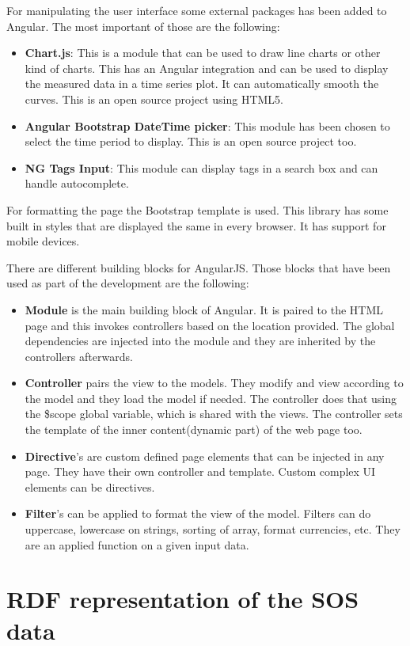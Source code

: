 For manipulating the user interface some external packages has been added to Angular. The most important of those are the following:
\begin{itemize}
\item \textbf{Chart.js}: This is a module that can be used to draw line charts or other kind of charts. This has an Angular integration and can be used to display the measured data in a time series plot. It can automatically smooth the curves. This is an open source project using HTML5.
\item \textbf{Angular Bootstrap DateTime picker}: This module has been chosen to select the time period to display. This is an open source project too.
\item \textbf{NG Tags Input}: This module can display tags in a search box and can handle autocomplete. 
\end{itemize}

For formatting the page the Bootstrap template is used. 
This library has some built in styles that are displayed the same in every browser. It has support for mobile devices.

There are different building blocks for AngularJS. Those blocks that have been used as part of the development are the following:
\begin{itemize}
\item \textbf{Module} is the main building block of Angular. It is paired to the HTML page and this invokes controllers based on the location provided. The global dependencies are injected into the module and they are inherited by the controllers afterwards.
\item \textbf{Controller} pairs the view to the models. They modify and view according to the model and they load the model if needed. The controller does that using the \$scope global variable, which is shared with the views. The controller sets the template of the inner content(dynamic part) of the web page too.
\item \textbf{Directive}'s are custom defined page elements that can be injected in any page. They have their own controller and template. Custom complex UI elements can be directives.
\item \textbf{Filter}'s can be applied to format the view of the model. Filters can do uppercase, lowercase on strings, sorting of array, format currencies, etc. They are an applied function on a given input data.
\end{itemize}

\section{RDF representation of the SOS data}

